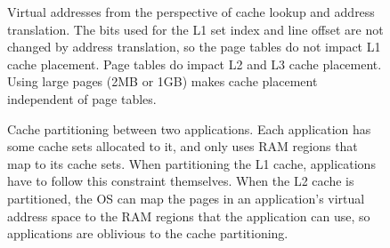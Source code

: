 \begin{figure}[hbt]
  \caption{
    Virtual addresses from the perspective of cache lookup and address
    translation. The bits used for the L1 set index and line offset are not
    changed by address translation, so the page tables do not impact L1 cache
    placement. Page tables do impact L2 and L3 cache placement. Using large
    pages (2MB or 1GB) makes cache placement independent of page tables.
  }
  \label{fig:caching_and_paging}
\end{figure}


\begin{figure}[hbt]
  \caption{
    Cache partitioning between two applications. Each application has some
    cache sets allocated to it, and only uses RAM regions that map to its cache
    sets. When partitioning the L1 cache, applications have to follow this
    constraint themselves. When the L2 cache is partitioned, the OS can map the
    pages in an application's virtual address space to the RAM regions that the
    application can use, so applications are oblivious to the cache
    partitioning.
  }
  \label{fig:cache_partitions}
\end{figure}
